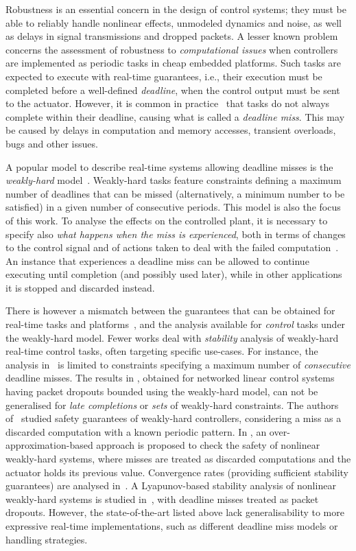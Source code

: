 Robustness is an essential concern in the design of control systems; they must be able to reliably handle nonlinear effects, unmodeled dynamics and noise, as well as delays in signal transmissions and dropped packets.
A lesser known problem concerns the assessment of robustness to \emph{computational issues} when controllers are implemented as periodic tasks in cheap embedded platforms.
Such tasks are expected to execute with real-time guarantees, i.e., their execution must be completed before a well-defined \emph{deadline}, when the control output must be sent to the actuator.
However, it is common in practice~\cite{akesson2020empirical} that tasks do not always complete within their deadline, causing what is called a \emph{deadline miss}.
This may be caused by delays in computation and memory accesses, transient overloads, bugs and other issues.

A popular model to describe real-time systems allowing deadline misses is the \emph{weakly-hard} model~\cite{Bernat:2001}. 
Weakly-hard tasks feature constraints defining a maximum number of deadlines that can be missed (alternatively, a minimum number to be satisfied) in a given number of consecutive periods.
This model is also the focus of this work.
To analyse the effects on the controlled plant, it is necessary to specify also \emph{what happens when the miss is experienced}, both in terms of changes to the control signal and of actions taken to deal with the failed computation~\cite{Pazzaglia:2019}.
An instance that experiences a deadline miss can be allowed to continue executing until completion (and possibly used later), while in other applications it is stopped and discarded instead.

There is however a mismatch between the guarantees that can be obtained for real-time tasks and platforms~\cite{Ernst:2015,choi2019job}, and the analysis available for \emph{control} tasks under the weakly-hard model.
Fewer works deal with \emph{stability} analysis of weakly-hard real-time control tasks, often targeting specific use-cases. 
For instance, the analysis in~\cite{Maggio:2020} is limited to constraints specifying a maximum number of \emph{consecutive} deadline misses.
The results in \cite{Linsenmayer:2017,linsenmayer2020linear}, obtained for networked linear control systems having packet dropouts bounded using the weakly-hard model, can not be generalised for \emph{late completions} or \emph{sets} of weakly-hard constraints.
The authors of~\cite{liang2019security,liang2020leveraging} studied safety guarantees of weakly-hard controllers, considering a miss as a discarded computation with a known periodic pattern.
In \cite{huang2020saw, huang2019formal}, an over-approximation-based approach is proposed to check the safety of nonlinear weakly-hard systems, where misses are treated as discarded computations and the actuator holds its previous value.
Convergence rates (providing sufficient stability guarantees) are analysed in~\cite{Gaukler:2019a}.
A Lyapunov-based stability analysis of nonlinear weakly-hard systems is studied in~\cite{hertneck2021efficient}, with deadline misses treated as packet dropouts.
However, the state-of-the-art listed above lack generalisability to more expressive real-time implementations, such as different deadline miss models or handling strategies.

